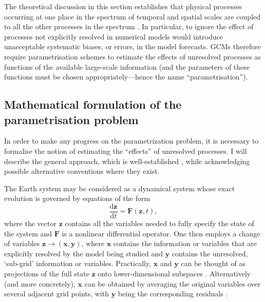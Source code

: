\documentclass[titlepage,twoside]{article}
\numberwithin{equation}{section}
\newcommand{\diff}[2]{\frac{\mathrm{d} #1}{\mathrm{d} #2}}
\renewcommand\vec{\bm}
\begin{document}
The theoretical discussion in this section establishes that physical processes
occurring at one place in the spectrum of temporal and spatial scales are
coupled to all the other processes in the spectrum \parencite{franzke2015}. In
particular, to ignore the effect of processes not explicitly resolved in
numerical models would introduce unacceptable systematic biases, or errors, in
the model forecasts. GCMs therefore require parametrisation schemes to estimate
the effects of unresolved processes as functions of the available large-scale
information (and the parameters of these functions must be chosen
appropriately---hence the name ``parametrisation'').


\subsection{Mathematical formulation of the parametrisation problem}%
\label{sec:math}
In order to make any progress on the parametrization problem, it is necessary
to formalise the notion of estimating the ``effects'' of unresolved processes.
I will describe the general approach, which is well-established \parencite[see,
e.g.,][]{hasselmann1976,palmer2001,demaeyer2018,brajard2021}, while
acknowledging possible alternative conventions where they exist.

The Earth system may be considered as a dynamical system whose exact evolution
is governed by equations of the form
\begin{equation} \label{eqn:truth}
    \diff{\vec{z}}{t} = \vec{F}(\vec{z},t),
\end{equation}
where the vector $\vec{z}$ contains all the variables needed to fully specify
the state of the system and $\vec{F}$ is a nonlinear differential operator. One
then employs a change of variables $\vec{z} \to (\vec{x},\vec{y})$, where
$\vec{x}$ contains the information or variables that are explicitly resolved by
the model being studied and $\vec{y}$ contains the unresolved, `sub-grid'
information or variables. Practically, $\vec{x}$ and $\vec{y}$ can be thought
of as projections of the full state $\vec{z}$ onto lower-dimensional
subspaces \parencite{brajard2021}. Alternatively (and more concretely),
$\vec{x}$ can be obtained by averaging the original variables over several
adjacent grid points, with $\vec{y}$ being the corresponding residuals
\parencite{zacharuk2018,alcala2021}.
\end{document}
